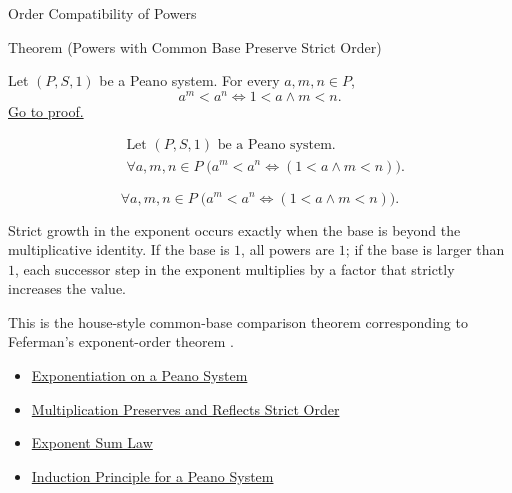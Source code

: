 \begin{topicbox}{Order Compatibility of Powers}
\begin{theorembox}{Theorem (Powers with Common Base Preserve Strict Order)}
\begin{theorem}
\label{thm:powers-with-common-base-preserve-strict-order}
Let $(P,S,1)$ be a Peano system. For every $a,m,n \in P$,
\[
a^m<a^n
\Longleftrightarrow
1<a \land m<n.
\]
\hyperref[prf:powers-with-common-base-preserve-strict-order]{Go to proof.}
\end{theorem}
\end{theorembox}

\begin{remark*}
\[
\begin{aligned}
&\text{Let } (P,S,1) \text{ be a Peano system.}\\
&\forall a,m,n \in P\;\bigl(a^m<a^n \Longleftrightarrow (1<a \land m<n)\bigr).
\end{aligned}
\]
\end{remark*}

\begin{remark*}
\[
\forall a,m,n \in P\;\bigl(a^m<a^n \Longleftrightarrow (1<a \land m<n)\bigr).
\]
\end{remark*}

\begin{remark*}[Interpretation]
Strict growth in the exponent occurs exactly when the base is beyond the
multiplicative identity. If the base is $1$, all powers are $1$; if the base
is larger than $1$, each successor step in the exponent multiplies by a factor
that strictly increases the value.


This is the house-style common-base comparison theorem corresponding to
Feferman's exponent-order theorem \citep{FefermanNumberSystems1964}.
\end{remark*}

\begin{dependencies}
\begin{itemize}
  \item \hyperref[def:exponentiation-on-peano-system]{Exponentiation on a Peano System}
  \item \hyperref[thm:multiplication-preserves-and-reflects-strict-order]{Multiplication Preserves and Reflects Strict Order}
  \item \hyperref[thm:exponent-sum-law]{Exponent Sum Law}
  \item \hyperref[thm:induction-principle-for-peano-system]{Induction Principle for a Peano System}
\end{itemize}
\end{dependencies}
\end{topicbox}

